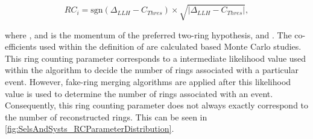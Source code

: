 \begin{equation}
  \label{eqn:SelsAndSysts_Systs_RCParam}
  RC_{i} = \text{sgn} \left(\Delta_{LLH} - C_{Thres} \right) \times \sqrt{\lvert \Delta_{LLH} - C_{Thres} \rvert},
\end{equation}

where , and  is the momentum of the preferred two-ring hypothesis, and . The co-efficients used within the definition of  are calculated based Monte Carlo studies. This ring counting parameter corresponds to a intermediate likelihood value used within the \fq algorithm to decide the number of rings associated with a particular event. However, fake-ring merging algorithms are applied after this likelihood value is used to determine the number of rings associated with an event. Consequently, this ring counting parameter does not always exactly correspond to the number of reconstructed rings. This can be seen in \autoref{fig:SelsAndSysts_RCParameterDistribution}.

